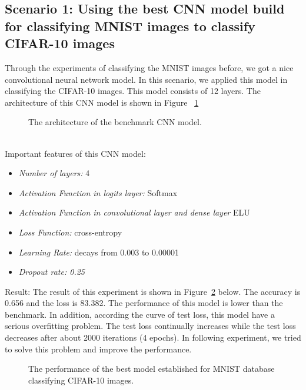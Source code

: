 \documentclass[]{UCD_CS_FYP_Report}
\begin{document}
\subsection{Scenario 1: Using the best CNN model build for classifying MNIST images to classify CIFAR-10 images}
Through the experiments of classifying the MNIST images before, we got a nice convolutional neural network model. In this scenario, we applied this model in classifying the CIFAR-10 images. This model consists of 12 layers. The architecture of this CNN model is shown in Figure ~\ref{fig:CIFAR_10_CNN_S1_Architecture}
\begin{figure}[h]
\centering
\fboxsep 2mm
\caption{\label{fig:CIFAR_10_CNN_S1_Architecture} The architecture of the benchmark CNN model.}
\end{figure}
\\Important features of this CNN model:
\begin{itemize}
\item {\sl Number of layers:} 4
\item {\sl Activation Function in logits layer:} Softmax
\item {\sl Activation Function in convolutional layer and dense layer} ELU
\item {\sl Loss Function:} cross-entropy
\item {\sl Learning Rate:} decays from 0.003 to 0.00001
\item {\sl Dropout rate: 0.25}
\end{itemize}
Result: The result of this experiment is shown in Figure~\ref{fig:CIFAR_10_CNN_S1E1} below. The accuracy is 0.656 and the loss is 83.382. The performance of this model is lower than the benchmark. In addition, according the curve of test loss, this model have a serious overfitting problem. The test loss continually increases while the test loss decreases after about 2000 iterations (4 epochs). In following experiment, we tried to solve this problem and improve the performance.
\begin{figure}[h]
\centering
\fboxsep 2mm
\caption{\label{fig:CIFAR_10_CNN_S1E1} The performance of the best model established for MNIST database classifying CIFAR-10 images.}
\end{figure}
\end{document}
